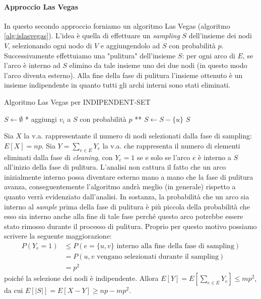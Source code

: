\paragraph*{Approccio Las Vegas}
In questo secondo approccio forniamo un algoritmo Las Vegas (algoritmo \ref{alg:islasvegas}). L'idea è quella di effettuare un \textit{sampling} $S$ dell'insieme dei nodi $V$, selezionando ogni nodo di $V$ e aggiungendolo ad $S$ con probabilità $p$. Successivamente effettuiamo una "pulitura" dell'insieme $S$: per ogni arco di $E$, se l'arco è interno ad $S$ elimino da tale insieme uno dei due nodi (in questo modo l'arco diventa esterno). Alla fine della fase di pulitura l'insieme ottenuto è un insieme indipendente in quanto tutti gli archi interni sono stati eliminati.

\begin{algorithm}
\caption{Algoritmo Las Vegas per INDIPENDENT-SET}
\label{alg:islasvegas}
\begin{algorithmic}
	\State $S\gets\emptyset$
		\State ** aggiungi $v_i$ a $S$ con probabilità $p$ **
	\EndFor
			\State $S\gets S-\{u\}$
		\EndIf
	\EndFor
	\State \Return $S$
\EndFunction
\end{algorithmic}
\end{algorithm}

Sia $X$ la v.a. rappresentante il numero di nodi selezionati dalla fase di sampling: $E[X]=np$. Sia $Y=\sum_{e\in E}Y_e$ la v.a. che rappresenta il numero di elementi eliminati dalla fase di \textit{cleaning}, con $Y_e=1$ se e solo se l'arco $e$ è interno a $S$ all'inizio della fase di pulitura. L'analisi non cattura il fatto che un arco inizialmente interno possa diventare esterno mano a mano che la fase di pulitura avanza, conseguentemente l'algoritmo andrà meglio (in generale) rispetto a quanto verrà evidenziato dall'analisi. In sostanza, la probabilità che un arco sia interno al \textit{sample} prima della fase di pulitura è più piccola della probabilità che esso sia interno anche alla fine di tale fase perché questo arco potrebbe essere stato rimosso durante il processo di pulitura. Proprio per questo motivo possiamo scrivere la seguente maggiorazione:
\begin{align*}
P(Y_e=1)&\leq P(e=\{u,v\} \text{ interno alla fine della fase di sampling}) \\
&=P(u,v \text{ vengano selezionati durante il sampling}) \\
&=p^2
\end{align*}
poiché la selezione dei nodi è indipendente.
Allora $E[Y]=E[\sum_{e\in E}Y_e]\leq mp^2$, da cui $E[|S|]=E[X-Y]\geq np-mp^2$.

